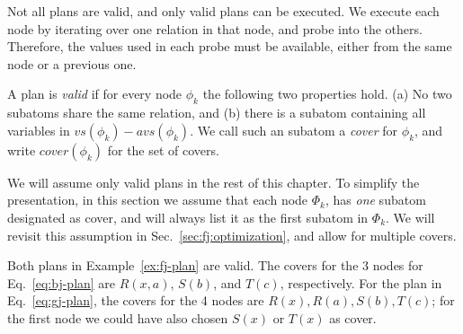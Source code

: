 
Not all \FJ plans are valid, and only valid plans can be executed.  We
execute each \FJ node by iterating over one relation in that node, and
probe into the others.  Therefore, the values used in each probe must
be available, either from the same node or a previous one.

\begin{defn}
  A \FJ plan is \emph{valid} if for every node $\phi_k$ the following
  two properties hold.  (a) No two subatoms share the same relation,
  and (b) there is a subatom containing all variables in
  $vs(\phi_k) - avs(\phi_k)$.  We call such an subatom a \emph{cover}
  for $\phi_k$, and write $cover(\phi_k)$ for the set of covers.
\end{defn}

We will assume only valid plans in the rest of this chapter.  To simplify
the presentation, in this section we assume that each node $\Phi_k$,
has {\em one} subatom designated as cover, and will always list it as
the first subatom in $\Phi_k$.  We will revisit this assumption in
Sec.~\ref{sec:fj:optimization}, and allow for multiple covers.


\begin{ex}
  Both plans in Example~\ref{ex:fj-plan} are valid.  The covers for
  the 3 nodes for Eq.~\eqref{eq:bj-plan} are $R(x, a)$, $S(b)$, and
  $T(c)$, respectively. For the plan in Eq.~\eqref{eq:gj-plan}, the
  covers for the 4 nodes are $R(x), R(a), S(b), T(c)$; for the first
  node we could have also chosen $S(x)$ or $T(x)$ as cover.
\end{ex}
 

